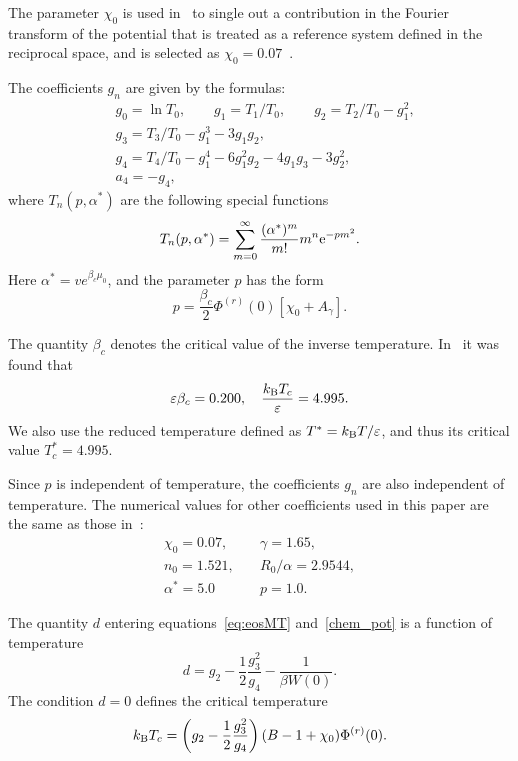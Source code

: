 The parameter $\chi_0$ is used in~\cite{KozlovskiiDobush2020} to single out a contribution in the Fourier transform of the potential that is treated as a reference system defined in the reciprocal space, and is selected as $\chi_0 = 0.07$~\cite{KozlovskiiDobush2020}.

The coefficients $g_n$ are given by the formulas:
\begin{align}
	& g_0 = \ln T_0, \qquad g_1 = T_1/T_0, \qquad g_2 = T_2/T_0 - g_1^2,  
	\nonumber \\
	& g_3 = T_3/T_0 - g_1^3 - 3g_1 g_2, 
	\nonumber\\
	& g_4 = T_4/T_0 - g_1^4 - 6 g_1^2 g_2 - 4 g_1 g_3 - 3 g_2^2, 
	\nonumber\\
	& a_4 = -g_4,
\end{align}
where $T_n(p,\alpha^*)$ are the following special functions
\begin{equation}
	T_n(p,\alpha^*) = \sum_{m=0}^{\infty} \frac{(\alpha^*)^m}{m!} m^n {\rm e}^{-pm^2}.
\end{equation}
Here $\alpha^*=v e^{\beta_c\mu_0}$, and the parameter $p$ has the form
\begin{equation}
	p = \frac{\beta_c}{2} \Phi^{(r)}(0) [\chi_0 + A_\gamma].
\end{equation} 

The quantity $\beta_c$ denotes the critical value of the inverse temperature. In~\cite{KozlovskiiDobush2020} it was found that
\begin{equation*}
	\varepsilon\beta_c = 0.200, \quad \frac{k_{\rm B} T_c}{\varepsilon} = 4.995.
\end{equation*}
We also use the reduced temperature defined as $T^* = k_{\rm B}T/\varepsilon$, and thus its critical value $T^*_c = 4.995.$

Since $p$ is independent of temperature, the coefficients $g_n$ are also independent of temperature. The numerical values for other coefficients used in this paper are the same as those in~\cite[eqs.~(5), (23), and~(24)]{KozlovskiiDobush2020}:
\begin{eqnarray}
	\label{params}
	\chi_0 = 0.07, & \quad \gamma = 1.65, \nonumber\\
	n_0 = 1.521, & \quad R_0/\alpha = 2.9544, \nonumber\\
	\alpha^* = 5.0 & \quad p = 1.0.
\end{eqnarray}

The quantity $d$ entering equations~\eqref{eq:eosMT} and~\eqref{chem_pot} is a function of temperature
\begin{equation}
	\label{def:D0}
	d = g_2 - \frac{1}{2} \frac{g_3^2}{g_4} - \frac{1}{\beta W(0)}.
\end{equation}
The condition $d = 0$ defines the critical temperature~\cite{KozlovskiiDobush2020}
\begin{equation}
	k_{\rm B}T_c = \left(g_2 - \frac{1}{2} \frac{g_3^2}{g_4} \right) (B - 1 + \chi_0) \Phi^{(r)}(0).
\end{equation}  

